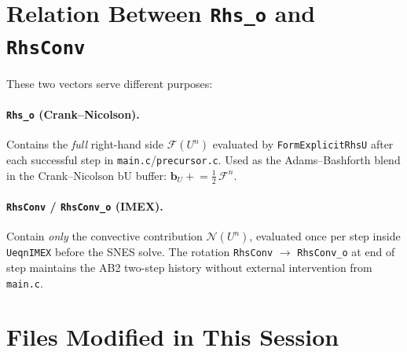 \documentclass[12pt,a4paper]{article}
\newcommand{\cN}{\mathcal{N}}
\newcommand{\half}{\tfrac{1}{2}}
\begin{document}
	\appendix
	\section{Relation Between \texttt{Rhs\_o} and \texttt{RhsConv}}
	
	These two vectors serve different purposes:
	
	\paragraph{\texttt{Rhs\_o} (Crank--Nicolson).}
	Contains the \emph{full} right-hand side $\mathcal{F}(U^n)$
	evaluated by \texttt{FormExplicitRhsU} after each successful step
	in \texttt{main.c}/\texttt{precursor.c}. Used as the Adams--Bashforth
	blend in the Crank--Nicolson bU buffer:
	$\bm{b}_U \mathrel{+}= \half\,\mathcal{F}^n$.
	
	\paragraph{\texttt{RhsConv} / \texttt{RhsConv\_o} (IMEX).}
	Contain \emph{only} the convective contribution $\cN(U^n)$,
	evaluated once per step inside \texttt{UeqnIMEX} before the SNES
	solve. The rotation \texttt{RhsConv} $\to$ \texttt{RhsConv\_o} at
	end of step maintains the AB2 two-step history without external
	intervention from \texttt{main.c}.
	
	\section{Files Modified in This Session}
	
\end{document}
